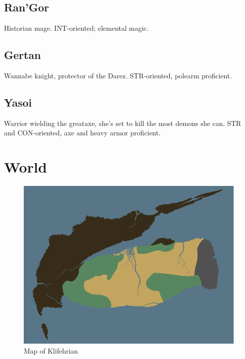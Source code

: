 \documentclass[a4paper,12pt]{book}
\begin{document}
\section{Ran'Gor}
Historian mage. INT-oriented; elemental magic.
\section{Gertan}
Wannabe knight, protector of the Darez. STR-oriented, polearm proficient.
\section{Yasoi}
Warrior wielding the greataxe, she's set to kill the most demons she can. STR and CON-oriented, axe and heavy armor proficient.
\chapter{World}
\begin{figure}[h]
	\centering
		\includegraphics[scale=2]{worldmap.png}
	\caption{Map of Klifehrian}
	\label{fig:worldmap}
\end{figure}
\end{document}
